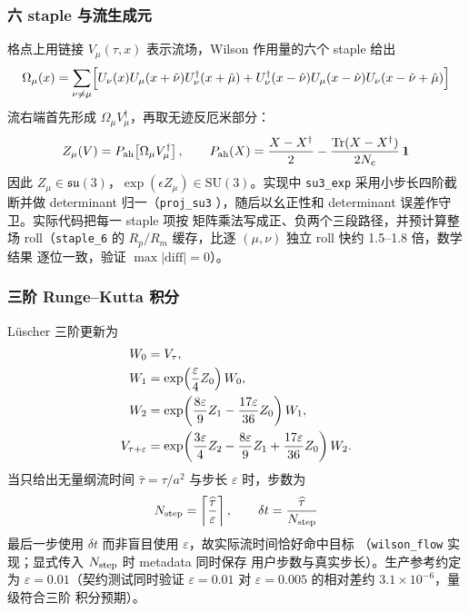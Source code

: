 \documentclass[11pt,a4paper]{ctexart}
\newcommand{\eps}{\varepsilon}
\newcommand{\tr}{\operatorname{Tr}}
\newcommand{\SU}{\mathrm{SU}}
\newcommand{\code}[1]{\texttt{#1}}
\newcommand{\zzh}{\widehat{\tau}}
\begin{document}
\subsubsection{六 staple 与流生成元}

格点上用链接 $V_\mu(\tau,x)$ 表示流场，Wilson 作用量的六个 staple 给出
\begin{equation}\label{eq:staple}
\Omega_\mu(x)=\sum_{\nu\ne\mu}
\Bigl[
U_\nu(x)U_\mu(x+\hat\nu)U_\nu^\dagger(x+\hat\mu)
+U_\nu^\dagger(x-\hat\nu)U_\mu(x-\hat\nu)
U_\nu(x-\hat\nu+\hat\mu)
\Bigr]
\end{equation}
流右端首先形成 $\Omega_\mu V_\mu^\dagger$，再取无迹反厄米部分：
\begin{equation}\label{eq:flow-generator}
Z_\mu(V)=P_{\rm ah}\!\left[\Omega_\mu V_\mu^\dagger\right],
\qquad
P_{\rm ah}(X)=\frac{X-X^\dagger}{2}
-\frac{\tr(X-X^\dagger)}{2N_c}\,\mathbf 1
\end{equation}
因此 $Z_\mu\in\mathfrak{su}(3)$，$\exp(\epsilon Z_\mu)\in\SU(3)$。实现中
\code{su3\_exp} 采用小步长四阶截断并做 determinant 归一（\code{proj\_su3}
），随后以幺正性和 determinant 误差作守卫。实际代码把每一 staple 项按
矩阵乘法写成正、负两个三段路径，并预计算整场 roll（\code{staple\_6} 的
$R_p/R_m$ 缓存，比逐 $(\mu,\nu)$ 独立 roll 快约 1.5--1.8 倍，数学结果
逐位一致，验证 $\max|\mathrm{diff}|=0$）。

\subsubsection{三阶 Runge--Kutta 积分}

Lüscher 三阶更新为
\begin{align}
W_0&=V_\tau, \notag\\
W_1&=\exp\!\left(\frac{\eps}{4}Z_0\right)W_0, \notag\\
W_2&=\exp\!\left(\frac{8\eps}{9}Z_1-\frac{17\eps}{36}Z_0\right)W_1, \notag\\
V_{\tau+\eps}
&=\exp\!\left(\frac{3\eps}{4}Z_2-\frac{8\eps}{9}Z_1
+\frac{17\eps}{36}Z_0\right)W_2.
\label{eq:rk3}
\end{align}
当只给出无量纲流时间 $\zzh=\tau/a^2$ 与步长 $\eps$ 时，步数为
\begin{equation}
N_{\rm step}=\left\lceil\frac{\zzh}{\eps}\right\rceil,
\qquad \delta t=\frac{\zzh}{N_{\rm step}}
\end{equation}
最后一步使用 $\delta t$ 而非盲目使用 $\eps$，故实际流时间恰好命中目标
（\code{wilson\_flow} 实现；显式传入 $N_{\rm step}$ 时 metadata 同时保存
用户步数与真实步长）。生产参考约定为 $\eps=0.01$（契约测试同时验证
$\eps=0.01$ 对 $\eps=0.005$ 的相对差约 $3.1\times10^{-6}$，量级符合三阶
积分预期）。
\end{document}
